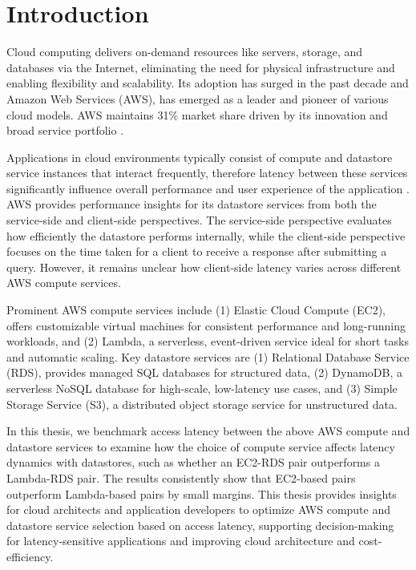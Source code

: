 \section{Introduction}
\label{cha:intro}

Cloud computing delivers on-demand resources like servers, storage, and databases via the Internet, eliminating the need for physical infrastructure and enabling flexibility and scalability. Its adoption has surged in the past decade and Amazon Web Services (AWS), has emerged as a leader and pioneer of various cloud models. AWS maintains 31\% market share driven by its innovation and broad service portfolio \cite{web_richter_cloud_market}.

Applications in cloud environments typically consist of compute and datastore service instances that interact frequently, therefore latency between these services significantly influence overall performance and user experience of the application \cite{atricle_dean_tail,book_popescu_netlat}. AWS provides performance insights for its datastore services from both the service-side and client-side perspectives. The service-side perspective evaluates how efficiently the datastore performs internally, while the client-side perspective focuses on the time taken for a client to receive a response after submitting a query. However, it remains unclear how client-side latency varies across different AWS compute services.

Prominent AWS compute services include (1) Elastic Cloud Compute (EC2), offers customizable virtual machines for consistent performance and long-running workloads, and (2) Lambda, a serverless, event-driven service ideal for short tasks and automatic scaling. Key datastore services are (1) Relational Database Service (RDS), provides managed SQL databases for structured data, (2) DynamoDB, a serverless NoSQL database for high-scale, low-latency use cases, and (3) Simple Storage Service (S3), a distributed object storage service for unstructured data.

In this thesis, we benchmark access latency between the above AWS compute and datastore services to examine how the choice of compute service affects latency dynamics with datastores, such as whether an EC2-RDS pair outperforms a Lambda-RDS pair. The results consistently show that EC2-based pairs outperform Lambda-based pairs by small margins. This thesis provides insights for cloud architects and application developers to optimize AWS compute and datastore service selection based on access latency, supporting decision-making for latency-sensitive applications and improving cloud architecture and cost-efficiency.

